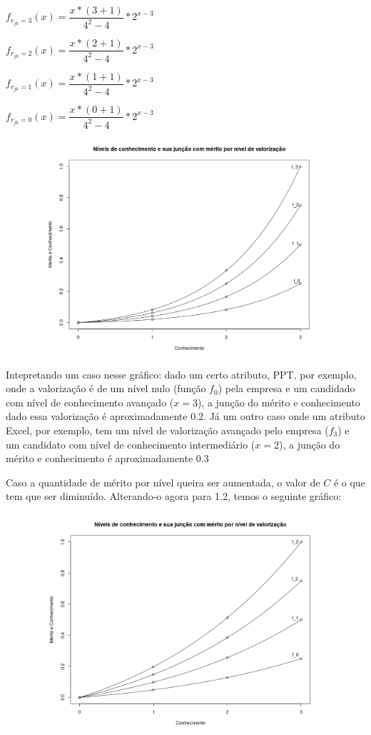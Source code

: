 \documentclass[]{article}
\begin{document}
	\begin{center}
		$ f_{r_{jk} = 3}(x) = \dfrac{x*(3 + 1)}{4^2 - 4} * 2^{x - 3} $
		
		$ f_{r_{jk} = 2}(x) = \dfrac{x*(2 + 1)}{4^2 - 4} * 2^{x - 3} $
		
		$ f_{r_{jk} = 1}(x) = \dfrac{x*(1 + 1)}{4^2 - 4} * 2^{x - 3} $
		
		$ f_{r_{jk} = 0}(x) = \dfrac{x*(0 + 1)}{4^2 - 4} * 2^{x - 3} $
	\end{center}
	\includegraphics[width=13.2cm, height=8cm]{plot}
	
	Intepretando um caso nesse gráfico: dado um certo atributo, PPT, por exemplo, onde a valorização é de um nível nulo (função $f_0$) pela empresa e um candidado com nível de conhecimento avançado ($x = 3$), a junção do mérito e conhecimento dado essa valorização é aproximadamente $0.2$. Já um outro caso onde um atributo Excel, por exemplo, tem um nível de valorização avançado pelo empresa ($f_3$) e um candidato com nível de conhecimento intermediário ($x = 2$), a junção do mérito e conhecimento é aproximadamente $0.3$
	
	Caso a quantidade de mérito por nível queira ser aumentada, o valor de $C$ é o que tem que ser diminuído. Alterando-o agora para 1.2, temos o seguinte gráfico:
	
	\includegraphics[width=13.2cm, height=8cm]{plot-2}
	
\end{document}

